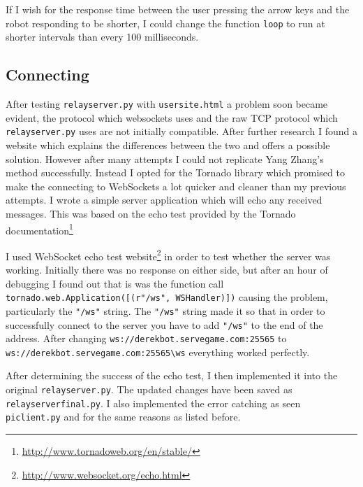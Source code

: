 \documentclass[]{report}   %
\begin{document}
						If I wish for the response time between the user pressing the arrow keys and the robot responding to be shorter, I could change the
						function \lstinline{loop} to run at shorter intervals than every 100 milliseconds.
					
					\subsection{Connecting}
						After testing \lstinline{relayserver.py} with \lstinline{usersite.html} a problem soon became evident, the protocol which websockets
						uses and the raw TCP protocol which \lstinline{relayserver.py} uses are not initially compatible. After further research I found
						a website\cite{websockets} which explains the differences between the two and offers a possible solution. However after many
						attempts I could not replicate  Yang Zhang's method successfully. Instead I opted for the Tornado library which promised to make
						the connecting to WebSockets a lot quicker and cleaner than my previous attempts. I wrote a simple server application which
						will echo any received messages. This was based on the echo test provided by the Tornado documentation\footnote{\url{http://www.tornadoweb.org/en/stable/}}
							
						
						I used WebSocket echo test website\footnote{\url{http://www.websocket.org/echo.html}} in order to test whether the server was working.
						Initially there was no response on either side, but after an hour of debugging I found out that is was the function call
						\lstinline{tornado.web.Application([(r"/ws", WSHandler)])} causing the problem, particularly the \lstinline{"/ws"} string.
						The \lstinline{"/ws"} string made it so that in order to successfully connect to the server you have to add \lstinline{"/ws"} to the
						end of the address. After changing \lstinline{ws://derekbot.servegame.com:25565} to \lstinline{ws://derekbot.servegame.com:25565\ws}
						everything worked perfectly.
						
						After determining the success of the echo test, I then implemented it into the original \lstinline{relayserver.py}. The updated changes
						have been saved as \lstinline{relayserverfinal.py}. I also implemented the error catching as seen \lstinline{piclient.py} and for the same
						reasons as listed before.
						
						
						
\end{document}
